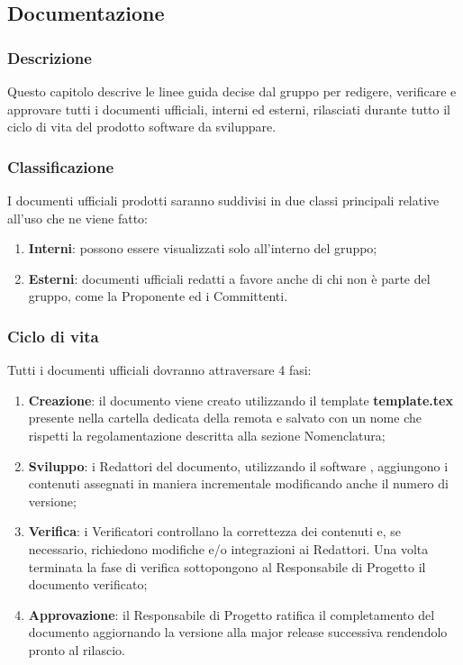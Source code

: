 \subsection{Documentazione}

	\subsubsection{Descrizione}
	Questo capitolo descrive le linee guida decise dal gruppo per redigere, verificare e approvare tutti i documenti ufficiali, interni ed esterni, rilasciati durante tutto il ciclo di vita del prodotto software da sviluppare.

	\subsubsection{Classificazione}
	I documenti ufficiali prodotti saranno suddivisi in due classi principali relative all'uso che ne viene fatto:
	\begin{enumerate}
		\item \textbf{Interni}: possono essere visualizzati solo all'interno del gruppo;
		\item \textbf{Esterni}: documenti ufficiali redatti a favore anche di chi non è parte del gruppo, come la Proponente ed i Committenti.
	\end{enumerate}

	\subsubsection{Ciclo di vita}
	Tutti i documenti ufficiali dovranno attraversare 4 fasi:
	\begin{enumerate}
		\item \textbf{Creazione}: il documento viene creato utilizzando il template \textbf{template.tex} presente nella cartella dedicata della  remota e salvato con un nome che rispetti la regolamentazione descritta alla sezione Nomenclatura;
		\item \textbf{Sviluppo}: i Redattori del documento, utilizzando il software , aggiungono i contenuti assegnati in maniera incrementale modificando anche il numero di versione;
		\item \textbf{Verifica}: i Verificatori controllano la correttezza dei contenuti e, se necessario, richiedono modifiche e/o integrazioni ai Redattori. Una volta terminata la fase di verifica sottopongono al Responsabile di Progetto il documento verificato;
		\item \textbf{Approvazione}: il Responsabile di Progetto ratifica il completamento del documento aggiornando la versione alla major release successiva rendendolo pronto al rilascio.
	\end{enumerate}

